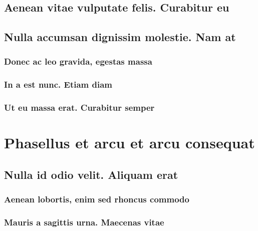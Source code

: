 \documentclass[%
  english,%
]{doctorate}
\begin{document}
\lipsum[1-8]

\subsection{Aenean vitae vulputate felis. Curabitur eu}

\lipsum[1-8]

\subsection{Nulla accumsan dignissim molestie. Nam at}

\lipsum[1-8]

\subsubsection{Donec ac leo gravida, egestas massa}

\lipsum[1-8]

\subsubsection{In a est nunc. Etiam diam}

\lipsum[1-8]

\subsubsection{Ut eu massa erat. Curabitur semper}

\lipsum[1-8]

\section{Phasellus et arcu et arcu consequat}

\lipsum[1-8]

\subsection{Nulla id odio velit. Aliquam erat}

\lipsum[1-8]

\subsubsection{Aenean lobortis, enim sed rhoncus commodo}

\lipsum[1-8]

\subsubsection{Mauris a sagittis urna. Maecenas vitae}
\end{document}
